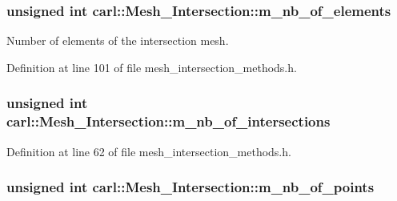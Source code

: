 \subsubsection[{m\+\_\+nb\+\_\+of\+\_\+elements}]{\setlength{\rightskip}{0pt plus 5cm}unsigned int carl\+::\+Mesh\+\_\+\+Intersection\+::m\+\_\+nb\+\_\+of\+\_\+elements\hspace{0.3cm}{\ttfamily [protected]}}\label{classcarl_1_1_mesh___intersection_acd2052a59c0bc759f86b3e4810093a54}


Number of elements of the intersection mesh. 



Definition at line 101 of file mesh\+\_\+intersection\+\_\+methods.\+h.

\hypertarget{classcarl_1_1_mesh___intersection_a60ae2905b3c3debe5194811e176826ce}{}
\subsubsection[{m\+\_\+nb\+\_\+of\+\_\+intersections}]{\setlength{\rightskip}{0pt plus 5cm}unsigned int carl\+::\+Mesh\+\_\+\+Intersection\+::m\+\_\+nb\+\_\+of\+\_\+intersections\hspace{0.3cm}{\ttfamily [protected]}}\label{classcarl_1_1_mesh___intersection_a60ae2905b3c3debe5194811e176826ce}


Definition at line 62 of file mesh\+\_\+intersection\+\_\+methods.\+h.

\hypertarget{classcarl_1_1_mesh___intersection_a64c49bef515c3b09edf6745d079056a2}{}
\subsubsection[{m\+\_\+nb\+\_\+of\+\_\+points}]{\setlength{\rightskip}{0pt plus 5cm}unsigned int carl\+::\+Mesh\+\_\+\+Intersection\+::m\+\_\+nb\+\_\+of\+\_\+points\hspace{0.3cm}{\ttfamily [protected]}}\label{classcarl_1_1_mesh___intersection_a64c49bef515c3b09edf6745d079056a2}


